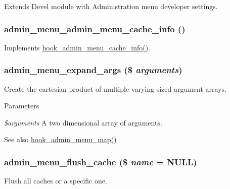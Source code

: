 Extends Devel module with Administration menu developer settings. \hypertarget{admin__menu_8inc_a9a83be386880f46f5f31e08be2529b51}{
\subsubsection[{admin\_\-menu\_\-admin\_\-menu\_\-cache\_\-info}]{\setlength{\rightskip}{0pt plus 5cm}admin\_\-menu\_\-admin\_\-menu\_\-cache\_\-info ()}}
\label{admin__menu_8inc_a9a83be386880f46f5f31e08be2529b51}
Implements \hyperlink{admin__menu_8api_8php_a4458e9bb8dfc9515707b474b9faceca6}{hook\_\-admin\_\-menu\_\-cache\_\-info()}. \hypertarget{admin__menu_8inc_ad075bcaf2a762dfd3e24bbe473aea445}{
\subsubsection[{admin\_\-menu\_\-expand\_\-args}]{\setlength{\rightskip}{0pt plus 5cm}admin\_\-menu\_\-expand\_\-args (\$ {\em arguments})}}
\label{admin__menu_8inc_ad075bcaf2a762dfd3e24bbe473aea445}
Create the cartesian product of multiple varying sized argument arrays.


\begin{DoxyParams}{Parameters}
\item[{\em \$arguments}]A two dimensional array of arguments.\end{DoxyParams}
\begin{DoxySeeAlso}{See also}
\hyperlink{admin__menu_8api_8php_a4b3f2235db483f670a2e7327633868df}{hook\_\-admin\_\-menu\_\-map()} 
\end{DoxySeeAlso}
\hypertarget{admin__menu_8inc_a954c039363bc1ce4c1fa1260f4f107e2}{
\subsubsection[{admin\_\-menu\_\-flush\_\-cache}]{\setlength{\rightskip}{0pt plus 5cm}admin\_\-menu\_\-flush\_\-cache (\$ {\em name} = {\ttfamily NULL})}}
\label{admin__menu_8inc_a954c039363bc1ce4c1fa1260f4f107e2}
Flush all caches or a specific one.


